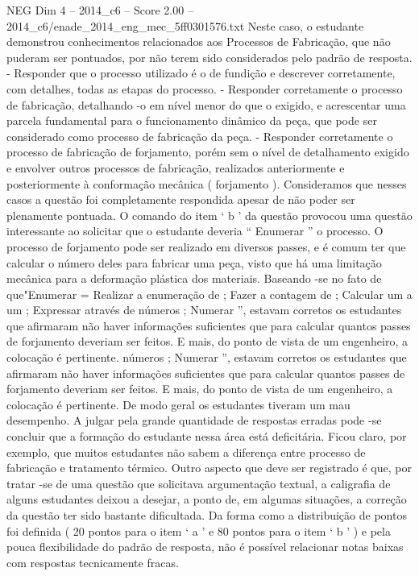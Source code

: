 \begin{textsample}{NEG Dim 4 – 2014\_c6 – Score 2.00 – 2014\_c6/enade\_2014\_eng\_mec\_5ff0301576.txt}
Neste caso, o estudante demonstrou conhecimentos relacionados aos Processos de Fabricação, que não puderam ser pontuados, por não terem sido considerados pelo padrão de resposta. - Responder que o processo utilizado é o de fundição e descrever corretamente, com detalhes, todas as etapas do processo. - Responder corretamente o processo de fabricação, detalhando -o em nível menor do que o exigido, e acrescentar uma parcela fundamental para o funcionamento dinâmico da peça, que pode ser considerado como processo de fabricação da peça. - Responder corretamente o processo de fabricação de forjamento, porém sem o nível de detalhamento exigido e envolver outros processos de fabricação, realizados anteriormente e posteriormente à conformação mecânica ( forjamento ).
Consideramos que nesses casos a questão foi completamente respondida apesar de não poder ser plenamente pontuada.
O comando do item ‘ b ’ da questão provocou uma questão interessante ao solicitar que o estudante deveria “ Enumerar ” o processo.
O processo de forjamento pode ser realizado em diversos passes, e é comum ter que calcular o número deles para fabricar uma peça, visto que há uma limitação mecânica para a deformação plástica dos materiais.
Baseando -se no fato de que"Enumerar = Realizar a enumeração de ; Fazer a contagem de ; Calcular um a um ; Expressar através de números ; Numerar ”, estavam corretos os estudantes que afirmaram não haver informações suficientes que para calcular quantos passes de forjamento deveriam ser feitos.
E mais, do ponto de vista de um engenheiro, a colocação é pertinente. números ; Numerar ”, estavam corretos os estudantes que afirmaram não haver informações suficientes que para calcular quantos passes de forjamento deveriam ser feitos.
E mais, do ponto de vista de um engenheiro, a colocação é pertinente.
De modo geral os estudantes tiveram um mau desempenho.
A julgar pela grande quantidade de respostas erradas pode -se concluir que a formação do estudante nessa área está deficitária.
Ficou claro, por exemplo, que muitos estudantes não sabem a diferença entre processo de fabricação e tratamento térmico.
Outro aspecto que deve ser registrado é que, por tratar -se de uma questão que solicitava argumentação textual, a caligrafia de alguns estudantes deixou a desejar, a ponto de, em algumas situações, a correção da questão ter sido bastante dificultada.
Da forma como a distribuição de pontos foi definida ( 20 pontos para o item ‘ a ’ e 80 pontos para o item ‘ b ’ ) e pela pouca flexibilidade do padrão de resposta, não é possível relacionar notas baixas com respostas tecnicamente fracas.

\end{textsample}

